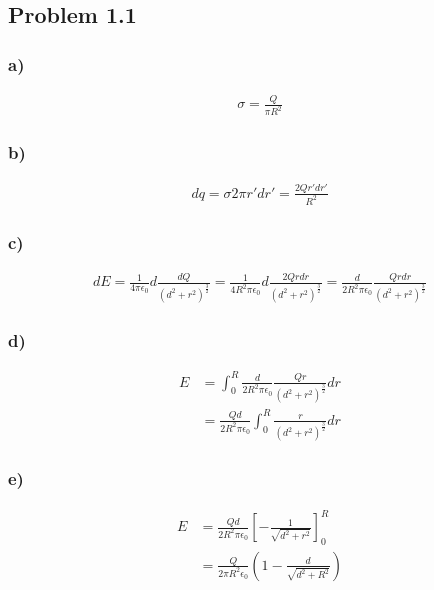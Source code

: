 \documentclass[../homework.tex]{subfiles}
\begin{document}
\subsection{Problem 1.1}
\subsubsection*{a)}
\begin{align*}
    \sigma = \frac{Q}{\pi R^2}
\end{align*}
\subsubsection*{b)}
\begin{align*}
    dq = \sigma 2\pi r' dr' =  \frac{2Q r' dr'}{R^2}
\end{align*}
\subsubsection*{c)}
\begin{align*}
    dE = \frac{1}{4 \pi \epsilon_0} d\frac{dQ}{(d^2 + r^2)^\frac{3}{2}} = \frac{1}{4 R^2 \pi \epsilon_0} d\frac{2Q r dr}{(d^2 + r^2)^\frac{3}{2}} = \frac{d}{2 R^2 \pi \epsilon_0} \frac{Q r dr}{(d^2 + r^2)^\frac{3}{2}}
\end{align*}
\subsubsection*{d)}
\begin{align*}
    E & = \int_{0}^{R} \frac{d}{2 R^2 \pi \epsilon_0} \frac{Q r}{(d^2 + r^2)^\frac{3}{2}} dr \\
      & = \frac{Qd}{2 R^2 \pi \epsilon_0}\int_{0}^{R} \frac{r}{(d^2 + r^2)^\frac{3}{2}} dr
\end{align*}
\subsubsection*{e)}
\begin{align*}
    E & = \frac{Qd}{2 R^2 \pi \epsilon_0} \left[
        - \frac{1}{\sqrt{d^2 + r^2}}
        \right]^R_0                            \\
      & = \frac{Q}{2 \pi R^2 \epsilon_0} \left(
    1 - \frac{d}{\sqrt{d^2 + R^2}}
    \right)
\end{align*}
\end{document}
